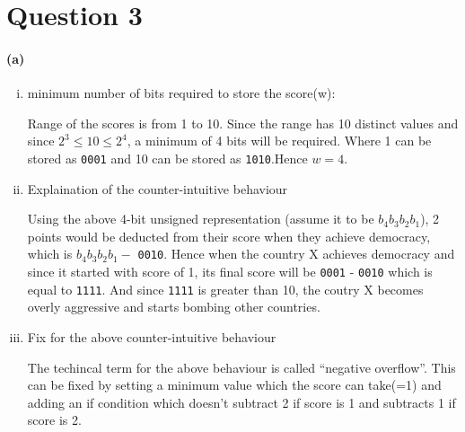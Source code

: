 \documentclass{article}
\begin{document}
\pagebreak
\section*{Question 3}
\label{sec:question-3}

\paragraph{(a)}
\begin{enumerate}[(i)]
\item\label{item:1} minimum number of bits required to store the score(w):\newline

  Range of the scores is from 1 to 10. Since the range has 10 distinct values and since $2^3 \leq 10 \leq 2^4$, a minimum of 4 bits will be required. Where 1 can be stored as \verb~0001~ and 10 can be stored as \verb~1010~.Hence $w = 4$.\newline\newline

\item\label{item:2} Explaination of the counter-intuitive behaviour\newline

  Using the above 4-bit unsigned representation (assume it to be $b_4b_3b_2b_1$), 2 points would be deducted from their score when they achieve democracy, which is $b_4b_3b_2b_1 -$ \verb~0010~. Hence when the country X achieves democracy and since it started with score of 1, its final score will be \verb~0001~ - \verb~0010~ which is equal to \verb~1111~. And since \verb~1111~ is greater than 10, the coutry X becomes overly aggressive and starts bombing other countries.\newline\newline

\item\label{item:3} Fix for the above counter-intuitive behaviour\newline

  The techincal term for the above behaviour is called ``negative overflow''. This can be fixed by setting a minimum value which the score can take(=1) and adding an if condition which doesn't subtract 2 if score is 1 and subtracts 1 if score is 2.\newline
\end{enumerate}
\end{document}
